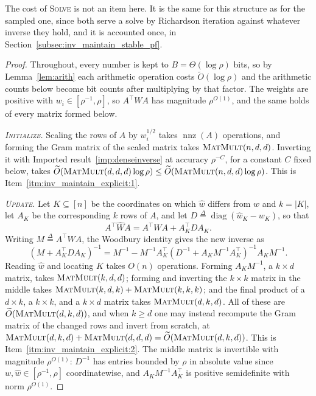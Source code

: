 \documentclass[11pt]{article}
\newcommand{\diag}{\operatorname{diag}}
\newcommand{\nnz}{\operatorname{nnz}}
\newcommand{\MM}{\textsc{MatMult}}
\renewcommand{\O}{\widetilde O}
\newcommand{\what}{\widehat{w}}
\newcommand{\defeq}{\stackrel{\Delta}{=}}
\begin{document}
The cost of \textsc{Solve} is not an item here.
It is the same for this structure as for the sampled one, since both serve a
solve by Richardson iteration against whatever inverse they hold, and it is
accounted once, in Section~\ref{subsec:inv_maintain_stable_pf}.

\begin{proof}
Throughout, every number is kept to $B = \Theta(\log \rho)$ bits, so by
Lemma~\ref{lem:arith} each arithmetic operation costs $\O(\log \rho)$ and the
arithmetic counts below become bit counts after multiplying by that factor.
The weights are positive with $w_i \in [\rho^{-1}, \rho]$, so
$A^\top W A$ has magnitude
$\rho^{O(1)}$, and the same holds of every matrix formed below.

\emph{\textsc{Initialize}.}
Scaling the rows of $A$ by
$w_i^{1/2}$ takes
$\nnz(A)$ operations, and forming the Gram matrix of the scaled matrix takes
$\MM(n, d, d)$.
Inverting it with Imported result~\ref{imp:denseinverse} at accuracy
$\rho^{-C}$, for a constant
$C$ fixed below, takes
$\O(\MM(d, d, d) \log \rho) \le \O(\MM(n, d, d) \log \rho)$.
This is Item~\ref{itm:inv_maintain_explicit:1}.

\emph{\textsc{Update}.}
Let $K \subseteq [n]$ be the coordinates on which
$\what$ differs from
$w$ and
$k = |K|$, let
$A_K$ be the corresponding
$k$ rows of
$A$, and let
$D \defeq \diag(\what_K - w_K)$, so that
\[
A^\top \widehat{W} A
=
A^\top W A + A_K^\top D A_K .
\]
Writing $M \defeq A^\top W A$, the Woodbury identity gives the new inverse as
\begin{equation}
\label{eq:woodbury}
\left( M + A_K^\top D A_K \right)^{-1}
=
M^{-1}
-
M^{-1} A_K^\top
\left( D^{-1} + A_K M^{-1} A_K^\top \right)^{-1}
A_K M^{-1} .
\end{equation}
Reading $\what$ and locating
$K$ takes
$O(n)$ operations.
Forming $A_K M^{-1}$, a
$k \times d$ matrix, takes
$\MM(k, d, d)$; forming and inverting the
$k \times k$ matrix in the middle takes
$\MM(k, d, k) + \MM(k, k, k)$; and the final product of a
$d \times k$, a
$k \times k$, and a
$k \times d$ matrix takes
$\MM(d, k, d)$.
All of these are $\O(\MM(d, k, d))$, and when
$k \ge d$ one may instead recompute the Gram matrix of the changed rows and
invert from scratch, at $\MM(d, k, d) + \MM(d, d, d) = \O(\MM(d, k, d))$.
This is Item~\ref{itm:inv_maintain_explicit:2}.
The middle matrix is invertible with magnitude $\rho^{O(1)}$:
$D^{-1}$ has entries bounded by
$\rho$ in absolute value since
$w, \what \in [\rho^{-1}, \rho]$ coordinatewise, and
$A_K M^{-1} A_K^\top$ is positive semidefinite with norm
$\rho^{O(1)}$.


\end{proof}
\end{document}
